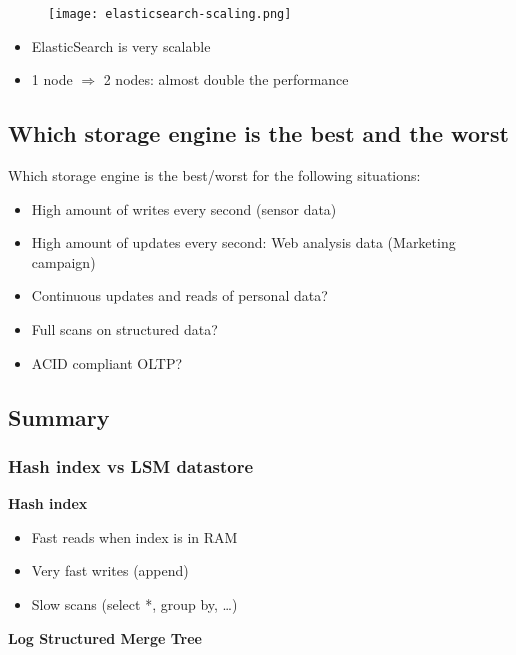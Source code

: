 \documentclass{article}
\begin{document}
\begin{figure}[H]
    \centering
    \texttt{[image: elasticsearch-scaling.png]}
\end{figure}

\begin{itemize}
    \item ElasticSearch is very scalable
    \item 1 node $\Rightarrow$ 2 nodes: almost double the performance
\end{itemize}

\subsection{Which storage engine is the best and the worst}

Which storage engine is the best/worst for the following situations:

\begin{itemize}
    \item High amount of writes every second (sensor data)
    \item High amount of updates every second: Web analysis data (Marketing campaign)
    \item Continuous updates and reads of personal data? 
    \item Full scans on structured data?
    \item ACID compliant OLTP?
\end{itemize}

\subsection{Summary}

\subsubsection{Hash index vs LSM datastore}

\textbf{Hash index}

\begin{itemize}
    \item Fast reads when index is in RAM
    \item Very fast writes (append)
    \item Slow scans (select *, group by, \dots)
\end{itemize}

\textbf{Log Structured Merge Tree}
\end{document}
